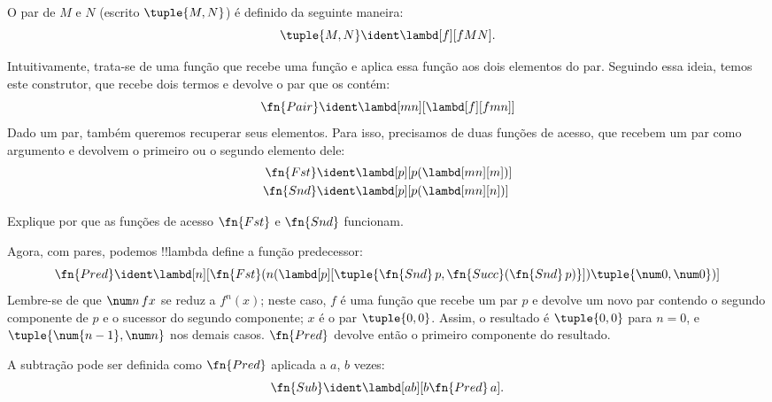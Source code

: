 \documentclass[../../../include/open-logic-section]{subfiles}
\begin{document}

\begin{defn}
O par de $M$ e $N$ (escrito $\tuple{M,N}$) é definido da seguinte maneira:
\[
\tuple{M,N} \ident \lambd[f][fMN].
\]
\end{defn}
  
Intuitivamente, trata-se de uma função que recebe uma função e aplica essa
função aos dois elementos do par. Seguindo essa ideia, temos este
construtor, que recebe dois termos e devolve o par que os contém:
\[
  \fn{Pair} \ident \lambd[mn][\lambd[f][fmn]]
\]
Dado um par, também queremos recuperar seus elementos.
Para isso, precisamos de duas funções de acesso, que recebem um par como argumento e
devolvem o primeiro ou o segundo elemento dele:
\begin{align*}
  \fn{Fst} & \ident \lambd[p][p(\lambd[mn][m])]\\
  \fn{Snd} & \ident \lambd[p][p(\lambd[mn][n])]
\end{align*}

\begin{prob}
  Explique por que as funções de acesso $\fn{Fst}$ e $\fn{Snd}$ funcionam.
\end{prob}

Agora, com pares, podemos !!{lambda define} a função predecessor:
\[
  \fn{Pred} \ident \lambd[n][\fn{Fst}(n (\lambd[p][\tuple{\fn{Snd}\, {p}, \fn{Succ}(\fn{Snd}\, {p})}]) \tuple{\num 0, \num 0})]
\]
Lembre-se de que $\num n\, f x$ se reduz a $f^{n}(x)$; neste
caso, $f$ é uma função que recebe um par $p$ e devolve um novo
par contendo o segundo componente de $p$ e o sucessor do
segundo componente; $x$ é o par $\tuple{0,0}$. Assim, o
resultado é $\tuple{0,0}$ para $n=0$, e $\tuple{\num{n-1}, \num n}$
nos demais casos. $\fn{Pred}$ devolve então o primeiro componente do resultado.

A subtração pode ser definida como $\fn{Pred}$ aplicada a $a$, $b$ vezes:
\[
\fn{Sub} \ident \lambd[ab][b \fn{Pred}\, a].
\]
    
\end{document}
